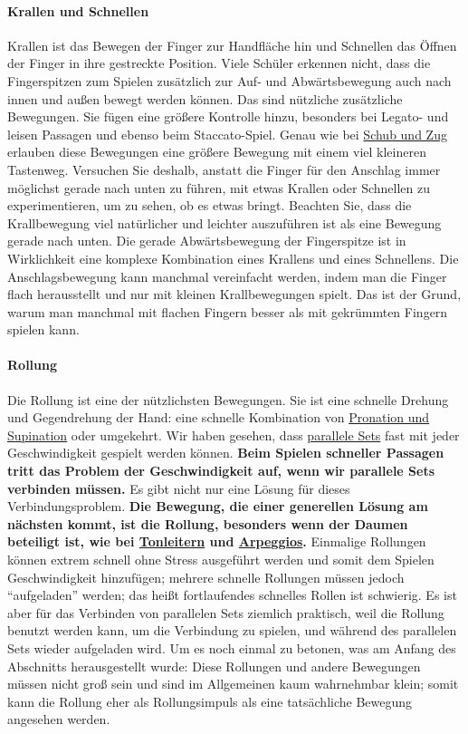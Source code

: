 \paragraph{Krallen und Schnellen}

Krallen ist das Bewegen der Finger zur Handfläche hin und Schnellen das Öffnen der Finger in ihre gestreckte Position.
Viele Schüler erkennen nicht, dass die Fingerspitzen zum Spielen zusätzlich zur Auf- und Abwärtsbewegung auch nach innen und außen bewegt werden können.
Das sind nützliche zusätzliche Bewegungen.
Sie fügen eine größere Kontrolle hinzu, besonders bei Legato- und leisen Passagen und ebenso beim Staccato-Spiel.
Genau wie bei \hyperref[c1iii4SchubZug]{Schub und Zug} erlauben diese Bewegungen eine größere Bewegung mit einem viel kleineren Tastenweg.
Versuchen Sie deshalb, anstatt die Finger für den Anschlag immer möglichst gerade nach unten zu führen, mit etwas Krallen oder Schnellen zu experimentieren, um zu sehen, ob es etwas bringt.
Beachten Sie, dass die Krallbewegung viel natürlicher und leichter auszuführen ist als eine Bewegung gerade nach unten.
Die gerade Abwärtsbewegung der Fingerspitze ist in Wirklichkeit eine komplexe Kombination eines Krallens und eines Schnellens.
Die Anschlagsbewegung kann manchmal vereinfacht werden, indem man die Finger flach herausstellt und nur mit kleinen Krallbewegungen spielt.
Das ist der Grund, warum man manchmal mit flachen Fingern besser als mit gekrümmten Fingern spielen kann.


\paragraph{Rollung}
\label{Rollung}

Die Rollung ist eine der nützlichsten Bewegungen.
Sie ist eine schnelle Drehung und Gegendrehung der Hand: eine schnelle Kombination von \hyperref[c1iii4ProSup]{Pronation und Supination} oder umgekehrt.
Wir haben gesehen, dass \hyperref[c1ii11]{parallele Sets} fast mit jeder Geschwindigkeit gespielt werden können.
\textbf{Beim Spielen schneller Passagen tritt das Problem der Geschwindigkeit auf, wenn wir parallele Sets verbinden müssen.}
Es gibt nicht nur eine Lösung für dieses Verbindungsproblem.
\textbf{Die Bewegung, die einer generellen Lösung am nächsten kommt, ist die Rollung, besonders wenn der Daumen beteiligt ist, wie bei \hyperref[c1iii5a]{Tonleitern} und \hyperref[Arpeggios]{Arpeggios}.}
Einmalige Rollungen können extrem schnell ohne Stress ausgeführt werden und somit dem Spielen Geschwindigkeit hinzufügen; mehrere schnelle Rollungen müssen jedoch \enquote{aufgeladen} werden; das heißt fortlaufendes schnelles Rollen ist schwierig.
Es ist aber für das Verbinden von parallelen Sets ziemlich praktisch, weil die Rollung benutzt werden kann, um die Verbindung zu spielen, und während des parallelen Sets wieder aufgeladen wird.
Um es noch einmal zu betonen, was am Anfang des Abschnitts herausgestellt wurde: Diese Rollungen und andere Bewegungen müssen nicht groß sein und sind im Allgemeinen kaum wahrnehmbar klein; somit kann die Rollung eher als Rollungsimpuls als eine tatsächliche Bewegung angesehen werden.


